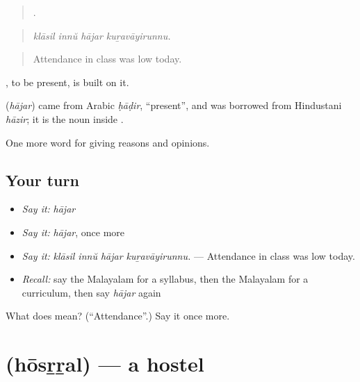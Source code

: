 \begin{quote}
   .
\end{quote}

\begin{quote}
\emph{klāsil innŭ hājar kuṟavāyirunnu.}
\end{quote}

\begin{quote}
Attendance in class was low today.
\end{quote}

, to be present, is built on it.

\begin{cousinweb}
\textbf{} (\emph{hājar}) came from Arabic \emph{ḥāḍir}, \textquotedblleft{}present\textquotedblright{}, and was borrowed from Hindustani \emph{hāzir}; it is the noun inside .
\end{cousinweb}

\begin{grammarlens}[title={What you've built}]
One more word for giving reasons and opinions.
\end{grammarlens}

\subsection*{Your turn}
\begin{itemize}
\raggedright
  \item \emph{Say it:} \emph{hājar}
  \item \emph{Say it:} \emph{hājar}, once more
  \item \emph{Say it:} \emph{klāsil innŭ hājar kuṟavāyirunnu.} — Attendance in class was low today.
  \item \emph{Recall:} say the Malayalam for a syllabus, then the Malayalam for a curriculum, then say \emph{hājar} again
\end{itemize}

\begin{tcolorbox}[breakable,colback=teal!4,colframe=teal!35!black,title={Before you move on}]
What does  mean? (\textquotedblleft{}Attendance\textquotedblright{}.) Say it once more.
\end{tcolorbox}
\section[\texorpdfstring{\ml{ഹോസ്റ്റൽ} (hōsṟṟal)}{ഹോസ്റ്റൽ (hōsṟṟal)}]{ (hōsṟṟal) — a hostel}

